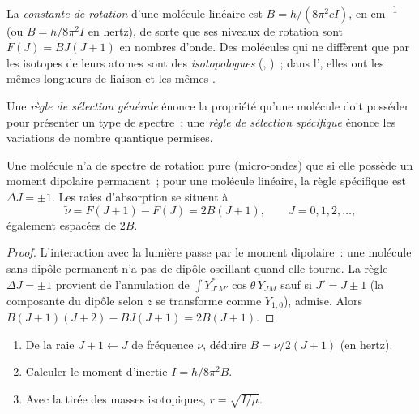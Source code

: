 \begin{definition}\label{def:b3:rovibrational-spectroscopy:rotational-constant}
La \emph{constante de rotation} d'une
molécule linéaire est $B = h/(8\pi^2cI)$, en \unit{cm^{-1}} (ou
$B = h/8\pi^2I$ en hertz), de sorte que ses niveaux de rotation sont
$F(J) = BJ(J+1)$ en nombres d'onde. Des molécules qui ne diffèrent que
par les isotopes de leurs atomes sont des \emph{isotopologues}
(, )~; dans l', elles ont les mêmes longueurs de liaison et les mêmes
.
\end{definition}

\begin{definition}\label{def:b3:rovibrational-spectroscopy:selection}
Une \emph{règle de sélection générale} énonce la
propriété qu'une molécule doit posséder pour présenter un type de spectre~;
une \emph{règle de sélection spécifique}
énonce les variations de nombre quantique permises.
\end{definition}

\begin{proposition}\label{prop:b3:rovibrational-spectroscopy:rotational-lines}
Une molécule n'a de spectre de rotation pure (micro-ondes) que si elle
possède un moment dipolaire permanent~; pour une molécule linéaire, la
règle spécifique est $\Delta J
= \pm1$. Les raies d'absorption se situent à
\[
\tilde\nu = F(J+1) - F(J) = 2B(J + 1), \qquad J = 0, 1, 2, \dots,
\]
également espacées de $2B$.
\end{proposition}

\begin{proof}
L'interaction avec la lumière passe par le moment dipolaire~: une
molécule sans dipôle permanent n'a pas de dipôle oscillant quand elle
tourne. La règle $\Delta J
= \pm1$ provient de l'annulation de $\int Y_{J'M'}^*\cos\theta\,Y_{JM}$
sauf si $J' = J
\pm 1$ (la composante du dipôle selon $z$ se transforme comme
$Y_{1,0}$), admise.
Alors $B(J+1)(J+2) - BJ(J+1) = 2B(J+1)$.
\end{proof}

\begin{method}\label{met:b3:rovibrational-spectroscopy:bond-length}
\begin{enumerate}
  \item De la raie $J + 1 \leftarrow J$ de fréquence $\nu$, déduire $B =
        \nu/2(J+1)$ (en hertz).
  \item Calculer le moment d'inertie $I = h/8\pi^2B$.
  \item Avec la  tirée des masses isotopiques, $r = \sqrt{I/\mu}$.
\end{enumerate}
\end{method}

